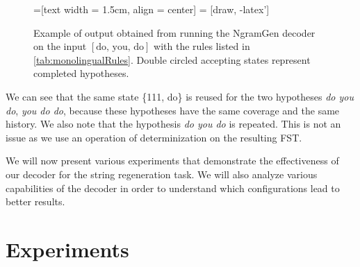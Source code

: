 \begin{figure}
  \scriptsize
  =[text width = 1.5cm, align = center]
   = [draw, -latex']

  \begin{center}
  \end{center}
  \caption{Example of output obtained from running the NgramGen decoder
    on the input $[\text{do, you, do}]$ with the rules listed
    in \autoref{tab:monolingualRules}. Double circled accepting states
    represent completed hypotheses.}
  \label{fig:exampleAlgoGyro}
\end{figure}
%
We can see that the same state \{111, do\} is reused for
the two hypotheses \emph{do you do}, \emph{you do do}, because
these hypotheses have the same coverage and the same history.
We also note that the hypothesis \emph{do you do} is repeated.
This is not an issue as we use an operation of determinization
on the resulting FST.

We will now present various experiments that demonstrate the effectiveness
of our decoder for the string regeneration task. We will also
analyze various capabilities of the decoder in order to
understand which configurations lead to better results.

\section{Experiments}

